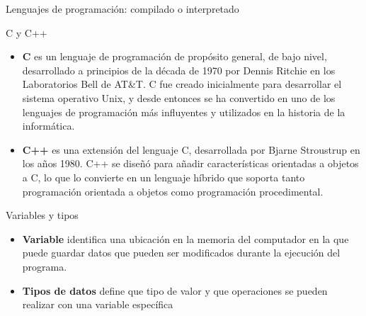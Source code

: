 \documentclass[aspectratio=169]{beamer}
\begin{document}
\begin{frame}[t]{Lenguajes de programación: compilado o interpretado}

\end{frame}

\begin{frame}[t]{C y C++}
\begin{itemize}
    \item \textbf{C} es un lenguaje de programación de propósito general, de bajo nivel, desarrollado a principios de la década de 1970 por Dennis Ritchie en los Laboratorios Bell de AT\&T. C fue creado inicialmente para desarrollar el sistema operativo Unix, y desde entonces se ha convertido en uno de los lenguajes de programación más influyentes y utilizados en la historia de la informática.
    \item \textbf{C++} es una extensión del lenguaje C, desarrollada por Bjarne Stroustrup en los años 1980. C++ se diseñó para añadir características orientadas a objetos a C, lo que lo convierte en un lenguaje híbrido que soporta tanto programación orientada a objetos como programación procedimental.
\end{itemize}
\end{frame}

\begin{frame}[t]{Variables y tipos}
\begin{itemize}
    \item \textbf{Variable} identifica una ubicación en la memoria del computador en la que puede guardar datos que pueden ser modificados durante la ejecución del programa.
    \item \textbf{Tipos de datos} define que tipo de valor y que operaciones se pueden realizar con una variable específica 
\end{itemize}
\end{frame}
\end{document}
